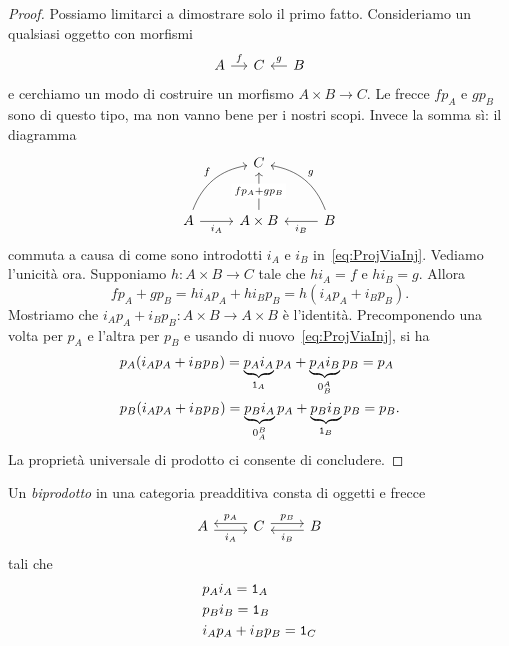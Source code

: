 \begin{proof}
  Possiamo limitarci a dimostrare solo il primo fatto. Consideriamo un
  qualsiasi oggetto con morfismi
  \[
    \begin{tikzcd}[column sep=small]
      A \ar["f", r] & C & B \ar["g", l, swap]
    \end{tikzcd}
  \]
  e cerchiamo un modo di costruire un morfismo \(A \times B \to C\). Le
  frecce \(f p_A\) e \(g p_B\) sono di questo tipo, ma non vanno bene
  per i nostri scopi. Invece la somma sì: il diagramma
  \[
    \begin{tikzcd}[row sep=large]
      & C \\
      A \ar["{i_A}", r, swap] \ar["f", ur, bend left] & A \times B
      \ar["{f p_A + g p_B}" description, u] & B \ar["{i_B}", l] \ar["g",
      ul, bend right, swap]
    \end{tikzcd}
  \]
  commuta a causa di come sono introdotti \(i_A\) e \(i_B\)
  in~\ref{eq:ProjViaInj}. Vediamo l'unicità ora. Supponiamo
  \(h : A \times B \to C\) tale che \(h i_A = f\) e \(h i_B =
  g\). Allora
  \[
    f p_A + g p_B = h i_A p_A + h i_B p_B = h (i_A p_A + i_B p_B) .
  \]
  Mostriamo che \(i_A p_A + i_B p_B : A \times B \to A \times B\) è
  l'identità. Precomponendo una volta per \(p_A\) e l'altra per \(p_B\)
  e usando di nuovo~\ref{eq:ProjViaInj}, si ha
  \begin{align*}
    & p_A (i_A p_A + i_B p_B) = \underbrace{p_A i_A}_{\id_A} p_A +
      \underbrace{p_A i_B}_{0_B^A} p_B = p_A \\
    & p_B (i_A p_A + i_B p_B) = \underbrace{p_B i_A}_{0_A^B} p_A +
      \underbrace{p_B i_B}_{\id_B} p_B = p_B .
  \end{align*}
  La proprietà universale di prodotto ci consente di concludere.
\end{proof}

\begin{definition}\label{definition:Biprodotto}
  Un {\em biprodotto} in una categoria preadditiva consta di oggetti e
  frecce
  \[
    \begin{tikzcd}
      A \ar["{i_A}", r, shift right, swap] & C \ar["{p_A}", l, shift
      right, swap] \ar["{p_B}", r, shift left] & B \ar["{i_B}", l, shift
      left]
    \end{tikzcd}
  \]
  tali che
  \begin{align}
    & p_A i_A = \mathtt 1_A \label{eqn:Biprod1} \\
    & p_B i_B = \mathtt 1_B \label{eqn:Biprod2}\\
    & i_A p_A + i_B p_B = \mathtt 1_C \label{eqn:Biprod3}
  \end{align}
\end{definition}

